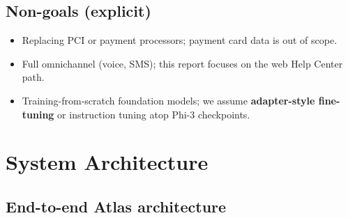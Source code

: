 \documentclass[11pt,a4paper,twoside]{report}
\begin{document}
\section{Non-goals (explicit)}
\begin{itemize}
\item Replacing PCI or payment processors; payment card data is out of scope.
\item Full omnichannel (voice, SMS); this report focuses on the web Help Center path.
\item Training-from-scratch foundation models; we assume \textbf{adapter-style fine-tuning} or instruction tuning atop Phi-3 checkpoints.
\end{itemize}

\chapter{System Architecture}
\label{ch:architecture}

\section{End-to-end Atlas architecture}
\end{document}
